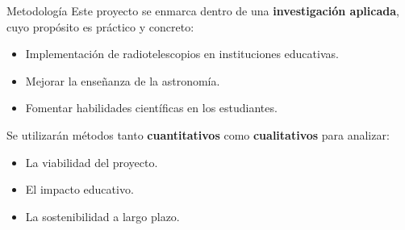 \begin{frame}{Metodología}
Este proyecto se enmarca dentro de una \textbf{investigación aplicada}, cuyo 
propósito es práctico y concreto: 

	\begin{itemize}
    \item Implementación de radiotelescopios en instituciones educativas.
    \item Mejorar la enseñanza de la astronomía.
    \item Fomentar habilidades científicas en los estudiantes.
	\end{itemize}

Se utilizarán métodos tanto \textbf{cuantitativos} como \textbf{cualitativos} 
para analizar:

	\begin{itemize}
    \item La viabilidad del proyecto.
    \item El impacto educativo.
    \item La sostenibilidad a largo plazo.
	\end{itemize}
\end{frame}
